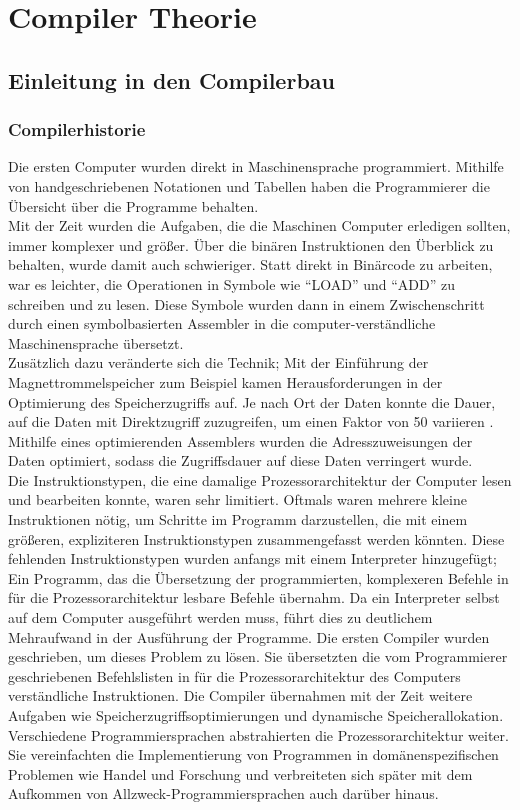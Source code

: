\part{Compiler Theorie}
\chapter{Einleitung in den Compilerbau}
\label{chap:theory:compilerHistory}

\section{Compilerhistorie}

Die ersten Computer wurden direkt in Maschinensprache programmiert.
Mithilfe von handgeschriebenen Notationen und Tabellen haben die Programmierer die Übersicht über
die Programme behalten.\\
Mit der Zeit wurden die Aufgaben, die die Maschinen Computer erledigen sollten, immer komplexer und größer.
Über die binären Instruktionen den Überblick zu behalten, wurde damit auch schwieriger.
Statt direkt in Binärcode zu arbeiten, war es leichter, die Operationen in Symbole wie ``LOAD'' und ``ADD'' zu schreiben und zu lesen.
Diese Symbole wurden dann in einem Zwischenschritt durch einen symbolbasierten Assembler in die computer-verständliche Maschinensprache übersetzt.\\
Zusätzlich dazu veränderte sich die Technik; 
Mit der Einführung der Magnettrommelspeicher zum Beispiel kamen Herausforderungen in der Optimierung des Speicherzugriffs auf.
Je nach Ort der Daten konnte die Dauer, auf die Daten mit Direktzugriff zuzugreifen, um einen Faktor von 50 variieren \cite{calingaert:1979}.
Mithilfe eines optimierenden Assemblers wurden die Adresszuweisungen der Daten optimiert, sodass die Zugriffsdauer auf diese Daten verringert wurde.\\
Die Instruktionstypen, die eine damalige Prozessorarchitektur der Computer lesen und bearbeiten konnte, waren sehr limitiert.
Oftmals waren mehrere kleine Instruktionen nötig, um Schritte im Programm darzustellen, die mit einem größeren, expliziteren Instruktionstypen
zusammengefasst werden könnten.
Diese fehlenden Instruktionstypen wurden anfangs mit einem Interpreter hinzugefügt; Ein Programm, das die Übersetzung der programmierten, komplexeren Befehle
in für die Prozessorarchitektur lesbare Befehle übernahm.
Da ein Interpreter selbst auf dem Computer ausgeführt werden muss, führt dies zu deutlichem Mehraufwand in der Ausführung der Programme.
Die ersten Compiler wurden geschrieben, um dieses Problem zu lösen.
Sie übersetzten die vom Programmierer geschriebenen Befehlslisten in für die Prozessorarchitektur des Computers verständliche Instruktionen.
Die Compiler übernahmen mit der Zeit weitere Aufgaben wie Speicherzugriffsoptimierungen und dynamische Speicherallokation.
Verschiedene Programmiersprachen abstrahierten die Prozessorarchitektur weiter.
Sie vereinfachten die Implementierung von Programmen in domänenspezifischen Problemen wie Handel und Forschung und verbreiteten sich später mit dem Aufkommen von Allzweck-Programmiersprachen auch darüber hinaus\cite{calingaert:1979}.

